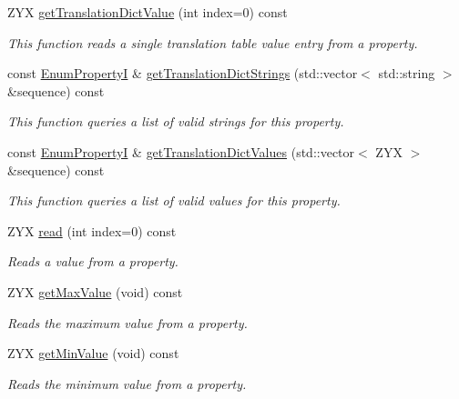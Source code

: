 \begin{DoxyCompactItemize}
Z\+Y\+X \hyperlink{classmv_i_m_p_a_c_t_1_1acquire_1_1_enum_property_i_a0c50700ebff2806621c63d03b624f200}{get\+Translation\+Dict\+Value} (int index=0) const 
\begin{DoxyCompactList}\small\item\em This function reads a single translation table value entry from a property. \end{DoxyCompactList}\item 
const \hyperlink{classmv_i_m_p_a_c_t_1_1acquire_1_1_enum_property_i}{Enum\+Property\+I} \& \hyperlink{classmv_i_m_p_a_c_t_1_1acquire_1_1_enum_property_i_a0ba6ccbf5ee69784d5d0b537924d26b6}{get\+Translation\+Dict\+Strings} (std\+::vector$<$ std\+::string $>$ \&sequence) const 
\begin{DoxyCompactList}\small\item\em This function queries a list of valid strings for this property. \end{DoxyCompactList}\item 
const \hyperlink{classmv_i_m_p_a_c_t_1_1acquire_1_1_enum_property_i}{Enum\+Property\+I} \& \hyperlink{classmv_i_m_p_a_c_t_1_1acquire_1_1_enum_property_i_a3c8c16a73d5640a9603d8f7082173ace}{get\+Translation\+Dict\+Values} (std\+::vector$<$ Z\+Y\+X $>$ \&sequence) const 
\begin{DoxyCompactList}\small\item\em This function queries a list of valid values for this property. \end{DoxyCompactList}\item 
Z\+Y\+X \hyperlink{classmv_i_m_p_a_c_t_1_1acquire_1_1_enum_property_i_a6f88e97f646978391226aaf82cd5955d}{read} (int index=0) const 
\begin{DoxyCompactList}\small\item\em Reads a value from a property. \end{DoxyCompactList}\item 
Z\+Y\+X \hyperlink{classmv_i_m_p_a_c_t_1_1acquire_1_1_enum_property_i_ad0697983e878d4195ef6414d837e3212}{get\+Max\+Value} (void) const 
\begin{DoxyCompactList}\small\item\em Reads the maximum value from a property. \end{DoxyCompactList}\item 
Z\+Y\+X \hyperlink{classmv_i_m_p_a_c_t_1_1acquire_1_1_enum_property_i_a906741ebe9a9f23d56416af0bc788485}{get\+Min\+Value} (void) const 
\begin{DoxyCompactList}\small\item\em Reads the minimum value from a property. \end{DoxyCompactList}\item 

\end{DoxyCompactItemize}

